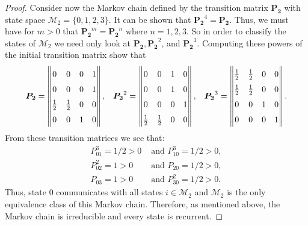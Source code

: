 \begin{proof}
  Consider now the Markov chain defined by the transition matrix $\boldsymbol{P_2}$ with state space $\mathcal{M}_2 = \{0, 1, 2, 3\}$.
  It can be shown that $\boldsymbol{P_2}^4 = \boldsymbol{P_2}$. Thus, we must have for $m > 0 $ that $\boldsymbol{P_2}^m = \boldsymbol{P_2}^n$
  where $n = 1,2,3$. So in order to classify the states of $\mathcal{M}_2$ we need only look at $\boldsymbol{P_2}, \boldsymbol{P_2}^2$, and $\boldsymbol{P_2}^3$.
  Computing these powers of the initial transition matrix show that
  \begin{align*}
    \renewcommand\arraystretch{1.5}
    \begin{array}{lll}
      \boldsymbol{P_2} =
      \begin{Vmatrix}
        0           & 0           & 0           & 1 \\
        0           & 0           & 0           & 1 \\
        \frac{1}{2} & \frac{1}{2} & 0           & 0 \\
        0           & 0           & 1           & 0\\
      \end{Vmatrix},
      &
      \boldsymbol{P_2}^2 =
      \begin{Vmatrix}
        0           & 0           & 1           & 0 \\
        0           & 0           & 1           & 0 \\
        0           & 0           & 0           & 1 \\
        \frac{1}{2} & \frac{1}{2} & 0           & 0\\
      \end{Vmatrix},
      &
      \boldsymbol{P_2}^3 =
      \begin{Vmatrix}
        \frac{1}{2} & \frac{1}{2} & 0           & 0 \\
        \frac{1}{2} & \frac{1}{2} & 0           & 0 \\
        0           & 0           & 1           & 0 \\
        0           & 0           & 0           & 1 \\
      \end{Vmatrix}.
    \end{array}
  \end{align*}
  From these transition matrices we see that:
  \begin{align*}
    P_{01}^3 = 1/2 > 0 &\text{ and } P_{10}^3 = 1/2 >0, \\
    P_{02}^2 = 1 > 0 &\text{ and } P_{20} = 1/2 >0, \\
    P_{03} = 1 > 0 &\text{ and } P_{30}^2 = 1/2 >0.
  \end{align*}
  Thus, state 0 communicates with all states $i\in\mathcal{M}_2$ and $\mathcal{M}_2$
  is the only equivalence class of this Markov chain. Therefore, as mentioned above,
  the Markov chain is irreducible and every state is recurrent.


\end{proof}
